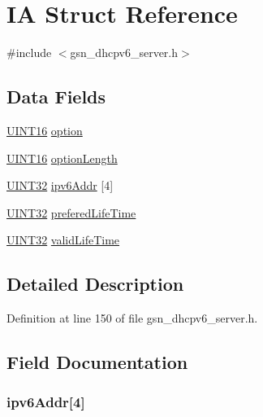 \hypertarget{a00448}{
\section{IA Struct Reference}
\label{a00448}
}


{\ttfamily \#include $<$gsn\_\-dhcpv6\_\-server.h$>$}

\subsection*{Data Fields}
\begin{DoxyCompactItemize}
\item 
\hyperlink{a00660_ga09f1a1fb2293e33483cc8d44aefb1eb1}{UINT16} \hyperlink{a00448_a4ea9b0ff2f7afc39a9ce6e27efea3c1a}{option}
\item 
\hyperlink{a00660_ga09f1a1fb2293e33483cc8d44aefb1eb1}{UINT16} \hyperlink{a00448_a34af08bbd90310de2d99728fb4bc5aee}{optionLength}
\item 
\hyperlink{a00660_gae1e6edbbc26d6fbc71a90190d0266018}{UINT32} \hyperlink{a00448_a77742898e45706f985eb210e83296eb7}{ipv6Addr} \mbox{[}4\mbox{]}
\item 
\hyperlink{a00660_gae1e6edbbc26d6fbc71a90190d0266018}{UINT32} \hyperlink{a00448_ae592c3c5c825fa4f8dd57962b1a75824}{preferedLifeTime}
\item 
\hyperlink{a00660_gae1e6edbbc26d6fbc71a90190d0266018}{UINT32} \hyperlink{a00448_aa87f9d507d75c14447e994bd1503d42b}{validLifeTime}
\end{DoxyCompactItemize}


\subsection{Detailed Description}


Definition at line 150 of file gsn\_\-dhcpv6\_\-server.h.



\subsection{Field Documentation}
\hypertarget{a00448_a77742898e45706f985eb210e83296eb7}{
\subsubsection[{ipv6Addr}]{ {\bf ipv6Addr}\mbox{[}4\mbox{]}}}
\label{a00448_a77742898e45706f985eb210e83296eb7}


